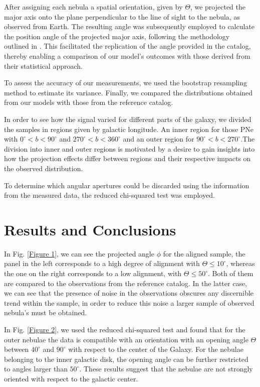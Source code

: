\documentclass[baaa]{baaa}
\begin{document}
After assigning each nebula a spatial orientation, given by $\Theta$, we projected the major axis onto the plane perpendicular to the line of sight to the nebula, as observed from Earth. 
The resulting angle was subsequently employed to calculate the position angle of the projected major axis, following the methodology outlined in \citep{2008PASP..120..380W}. This facilitated the replication of the angle provided in the catalog, thereby enabling a comparison of our model's outcomes with those derived from their statistical approach.

To assess the accuracy of our measurements, we used the bootstrap resampling method to estimate its variance. Finally, we compared the distributions obtained from our models with those from the reference catalog.

In order to see how the signal varied for different parts of the galaxy, we divided the samples in regions given by galactic longitude. An inner region for those PNe with $0^\circ< b <90^\circ$ and $270^\circ< b <360^\circ$ and an outer region for $90^\circ< b < 270^\circ$.The division into inner and outer regions is motivated by a desire to gain insights into how the projection effects differ between regions and their respective impacts on the observed distribution.

To determine which angular apertures could be discarded using the information from the measured data, the reduced chi-squared test was employed.

\section{Results and Conclusions}

In Fig. \ref{Figure 1}, we can see the projected angle $\phi$ for the aligned sample, the panel in the left corresponds to a high degree of alignment with $\Theta \leq 10^\circ$, whereas the one on the right corresponds to a low alignment, with  $\Theta \leq 50^\circ$. Both of them are compared to the observations from the reference catalog. In the latter case, we can see that the presence of noise in the observations obscures any discernible trend within the sample, in order to reduce this noise a larger sample of observed nebula's must be obtained. 

In Fig. \ref{Figure 2}, we used the reduced chi-squared test and found that for the outer nebulae the data is compatible with an orientation with an opening angle $\Theta$ between $40^\circ$ and $90^\circ$ with respect to the center of the Galaxy. For the nebulae belonging to the inner galactic disk, the opening angle can be further restricted to angles larger than $50^\circ$. These results suggest that the nebulae are not strongly oriented with respect to the galactic center. 
\end{document}
